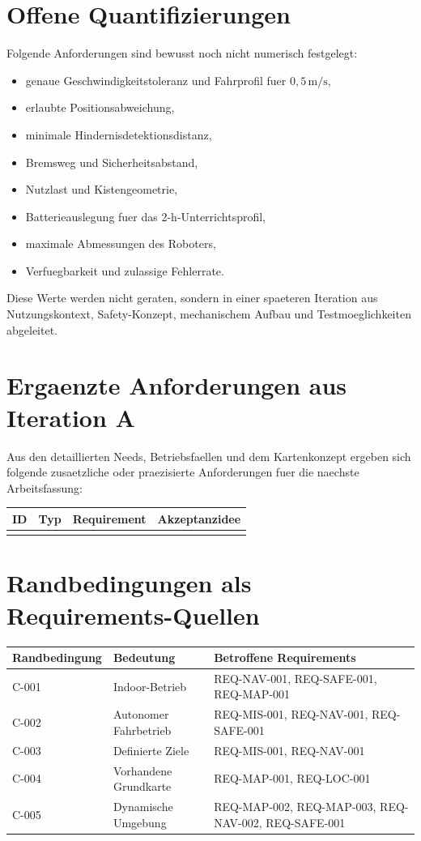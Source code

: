 \section{Offene Quantifizierungen}

Folgende Anforderungen sind bewusst noch nicht numerisch festgelegt:
\begin{itemize}
  \item genaue Geschwindigkeitstoleranz und Fahrprofil fuer $0{,}5\,\mathrm{m/s}$,
  \item erlaubte Positionsabweichung,
  \item minimale Hindernisdetektionsdistanz,
  \item Bremsweg und Sicherheitsabstand,
  \item Nutzlast und Kistengeometrie,
  \item Batterieauslegung fuer das 2-h-Unterrichtsprofil,
  \item maximale Abmessungen des Roboters,
  \item Verfuegbarkeit und zulassige Fehlerrate.
\end{itemize}

Diese Werte werden nicht geraten, sondern in einer spaeteren Iteration aus Nutzungskontext, Safety-Konzept, mechanischem Aufbau und Testmoeglichkeiten abgeleitet.

\section{Ergaenzte Anforderungen aus Iteration A}

Aus den detaillierten Needs, Betriebsfaellen und dem Kartenkonzept ergeben sich folgende zusaetzliche oder praezisierte Anforderungen fuer die naechste Arbeitsfassung:

\begin{longtable}{L{0.15\textwidth} L{0.16\textwidth} L{0.36\textwidth} L{0.18\textwidth}}
\toprule
ID & Typ & Requirement & Akzeptanzidee \\
\midrule
{}
\bottomrule
\end{longtable}

\section{Randbedingungen als Requirements-Quellen}

\begin{longtable}{L{0.15\textwidth} L{0.35\textwidth} L{0.32\textwidth}}
\toprule
Randbedingung & Bedeutung & Betroffene Requirements \\
\midrule
C-001 & Indoor-Betrieb & REQ-NAV-001, REQ-SAFE-001, REQ-MAP-001 \\
C-002 & Autonomer Fahrbetrieb & REQ-MIS-001, REQ-NAV-001, REQ-SAFE-001 \\
C-003 & Definierte Ziele & REQ-MIS-001, REQ-NAV-001 \\
C-004 & Vorhandene Grundkarte & REQ-MAP-001, REQ-LOC-001 \\
C-005 & Dynamische Umgebung & REQ-MAP-002, REQ-MAP-003, REQ-NAV-002, REQ-SAFE-001 \\
\bottomrule
\end{longtable}
